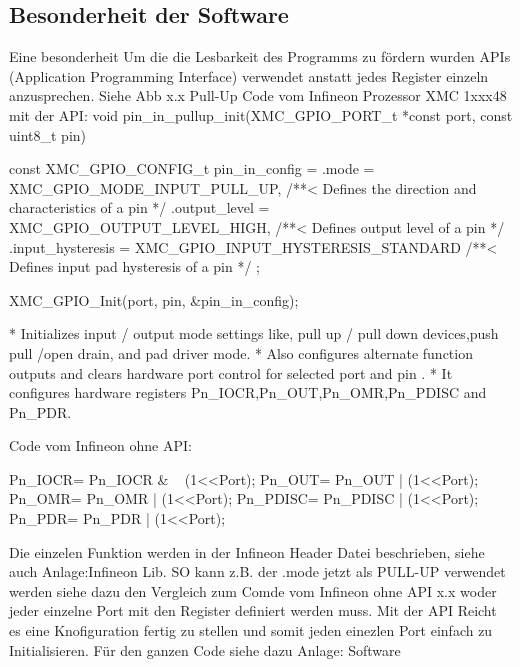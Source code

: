 \subsection{Besonderheit der Software}
Eine besonderheit 
Um die die Lesbarkeit des Programms zu fördern wurden APIs (Application Programming Interface) verwendet anstatt jedes Register einzeln anzusprechen.
Siehe Abb x.x Pull-Up
Code vom Infineon Prozessor XMC 1xxx48 mit der API:
void pin_in_pullup_init(XMC_GPIO_PORT_t *const port, const uint8_t pin)
{
  const	XMC_GPIO_CONFIG_t pin_in_config = {
  			.mode             = XMC_GPIO_MODE_INPUT_PULL_UP, /**< Defines the direction and characteristics of a pin */
  			.output_level     = XMC_GPIO_OUTPUT_LEVEL_HIGH, /**< Defines output level of a pin */
  			.input_hysteresis	= XMC_GPIO_INPUT_HYSTERESIS_STANDARD /**< Defines input pad hysteresis of a pin */
  		};

  XMC_GPIO_Init(port, pin, &pin_in_config);

 * Initializes input / output mode settings like, pull up / pull down devices,push pull /open drain, and pad driver mode.
 * Also configures alternate function outputs and clears hardware port control for selected \a port and \a pin .
 * It configures hardware registers Pn_IOCR,Pn_OUT,Pn_OMR,Pn_PDISC and Pn_PDR.\n
}


Code vom Infineon ohne API:

Pn_IOCR= 	Pn_IOCR & ~ (1<<Port); 	
Pn_OUT= 	Pn_OUT | (1<<Port);	
Pn_OMR=	Pn_OMR | (1<<Port);
Pn_PDISC=	Pn_PDISC | (1<<Port);
Pn_PDR=	Pn_PDR 	 | (1<<Port);



Die einzelen Funktion werden in der Infineon Header Datei beschrieben, siehe auch Anlage:Infineon Lib. SO kann z.B. der .mode jetzt als PULL-UP verwendet werden siehe dazu den Vergleich zum Comde vom Infineon ohne API  x.x woder jeder einzelne Port mit den Register definiert werden muss. Mit der API Reicht es eine Knofiguration fertig zu stellen und somit jeden einezlen Port einfach zu Initialisieren. Für den ganzen Code siehe dazu Anlage: Software 










